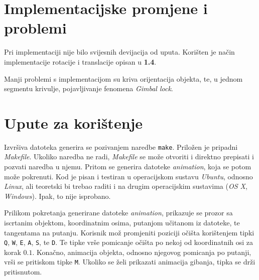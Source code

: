 \documentclass[10pt,a4paper]{article}
\begin{document}
\section{Implementacijske promjene i problemi}

Pri implementaciji nije bilo svijesnih devijacija od uputa. Kori\v{s}ten je na\v{c}in implementacije rotacije i translacije opisan u \textbf{1.4}.

Manji problemi s implementacijom su kriva orijentacija objekta, te, u jednom segmentu krivulje, pojavljivanje fenomena \emph{Gimbal lock}.

\section{Upute za kori\v{s}tenje}

Izvr\v{s}iva datoteka generira se pozivanjem naredbe \texttt{make}. Prilo\v{z}en je pripadni \emph{Makefile}. Ukoliko naredba ne radi, \emph{Makefile} se mo\v{z}e otvoriti i direktno prepisati i pozvati naredba u njemu. Pritom se generira datoteke \emph{animation}, koja se potom mo\v{z}e pokrenuti. Kod je pisan i testiran u operacijskom sustavu \emph{Ubuntu}, odnosno \emph{Linux}, ali teoretski bi trebao raditi i na drugim operacijskim sustavima (\emph{OS X}, \emph{Windows}). Ipak, to nije isprobano.

Prilikom pokretanja generirane datoteke \emph{animation}, prikazuje se prozor sa iscrtanim objektom, koordinatnim osima, putanjom u\v{c}itanom iz datoteke, te tangentama na putanju. Korisnik mo\v{z} promjeniti poziciji o\v{c}i\v{s}ta kori\v{s}tenjem tipki \texttt{Q}, \texttt{W}, \texttt{E}, \texttt{A}, \texttt{S}, te \texttt{D}. Te tipke vr\v{s}e pomicanje o\v{c}i\v{s}ta po nekoj od koordinatnih osi za korak $0.1$. Kona\v{c}no, animacija objekta, odnosno njegovog pomicanja po putanji, vr\v{s}i se pritiskom tipke \texttt{M}. Ukoliko se \v{z}eli prikazati animacija gibanja, tipka se dr\v{z}i pritisnutom.
\end{document}
